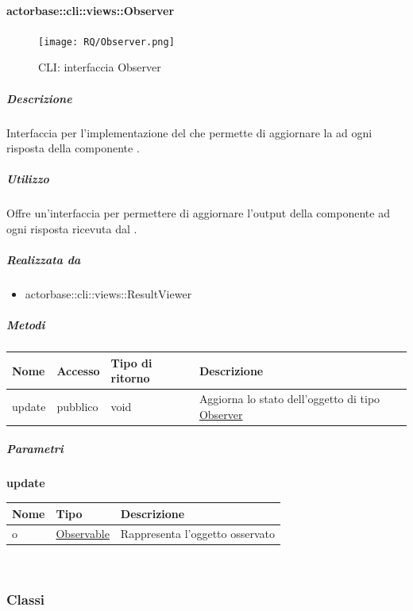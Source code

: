 \documentclass{scalatekids-article}
\begin{document}
\paragraph{actorbase::cli::views::Observer}
\label{sec:actorbase::cli::views::Observer}

\begin{figure}[H]
  \begin{center}
    \texttt{[image: RQ/Observer.png]}
    \caption{CLI: interfaccia Observer}
  \end{center}
\end{figure}

\subparagraph{Descrizione}
Interfaccia per l'implementazione del  
che permette di aggiornare la  ad ogni risposta della componente
.

\subparagraph{Utilizzo}
Offre un'interfaccia per permettere di aggiornare l'output della componente  ad ogni
risposta ricevuta dal .

\subparagraph{Realizzata da}
\begin{itemize}
\item actorbase::cli::views::ResultViewer
\end{itemize}

\subparagraph{Metodi}
\begin{tabular}{| p{3cm} | p{1.5cm} | p{3.5cm} | p{9cm} |}
  \hline
  Nome & Accesso & Tipo di ritorno & Descrizione\\
  \hline
  update & pubblico & void & Aggiorna lo stato dell'oggetto di tipo \hyperref[sec:actorbase::cli::views::Observer]{Observer}\\
  \hline
\end{tabular}

\subparagraph{Parametri}
\begin{center}
  \textbf{update}
\end{center}
\begin{tabular}{| p{3cm} | p{3.5cm} | p{8.5cm} |}
  \hline
  Nome & Tipo & Descrizione\\
  \hline
  o & \hyperref[actorbase::cli::models::Observable]{Observable} & Rappresenta l'oggetto osservato\\
  \hline
\end{tabular}\\

\subsubsection{Classi}
\end{document}
